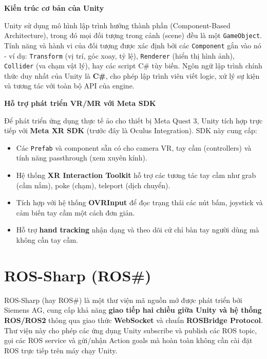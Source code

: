 \textbf{Kiến trúc cơ bản của Unity}

Unity sử dụng mô hình lập trình hướng thành phần (Component-Based Architecture), trong đó mọi đối tượng trong cảnh (scene) đều là một \lstinline[style=inlinecode]{GameObject}. Tính năng và hành vi của đối tượng được xác định bởi các \lstinline[style=inlinecode]{Component} gắn vào nó - ví dụ: \lstinline[style=inlinecode]{Transform} (vị trí, góc xoay, tỷ lệ), \lstinline[style=inlinecode]{Renderer} (hiển thị hình ảnh), \lstinline[style=inlinecode]{Collider} (va chạm vật lý), hay các script C\# tùy biến. Ngôn ngữ lập trình chính thức duy nhất của Unity là \textbf{C\#}, cho phép lập trình viên viết logic, xử lý sự kiện và tương tác với toàn bộ API của engine.

\textbf{Hỗ trợ phát triển VR/MR với Meta SDK}

Để phát triển ứng dụng thực tế ảo cho thiết bị Meta Quest 3, Unity tích hợp trực tiếp với \textbf{Meta XR SDK} (trước đây là Oculus Integration). SDK này cung cấp:

\begin{itemize}
    \item Các \lstinline[style=inlinecode]{Prefab} và component sẵn có cho camera VR, tay cầm (controllers) và tính năng passthrough (xem xuyên kính).
    \item Hệ thống \textbf{XR Interaction Toolkit} hỗ trợ các tương tác tay cầm như grab (cầm nắm), poke (chạm), teleport (dịch chuyển).
    \item Tích hợp với hệ thống \textbf{OVRInput} để đọc trạng thái các nút bấm, joystick và cảm biến tay cầm một cách đơn giản.
    \item Hỗ trợ \textbf{hand tracking} nhận dạng và theo dõi cử chỉ bàn tay người dùng mà không cần tay cầm.
\end{itemize}

\section{ROS-Sharp (ROS\#)}

ROS-Sharp (hay ROS\#) là một thư viện mã nguồn mở được phát triển bởi Siemens AG, cung cấp khả năng \textbf{giao tiếp hai chiều giữa Unity và hệ thống ROS/ROS2} thông qua giao thức \textbf{WebSocket} và chuẩn \textbf{ROSBridge Protocol}. Thư viện này cho phép các ứng dụng Unity subscribe và publish các ROS topic, gọi các ROS service và gửi/nhận Action goals mà hoàn toàn không cần cài đặt ROS trực tiếp trên máy chạy Unity.

